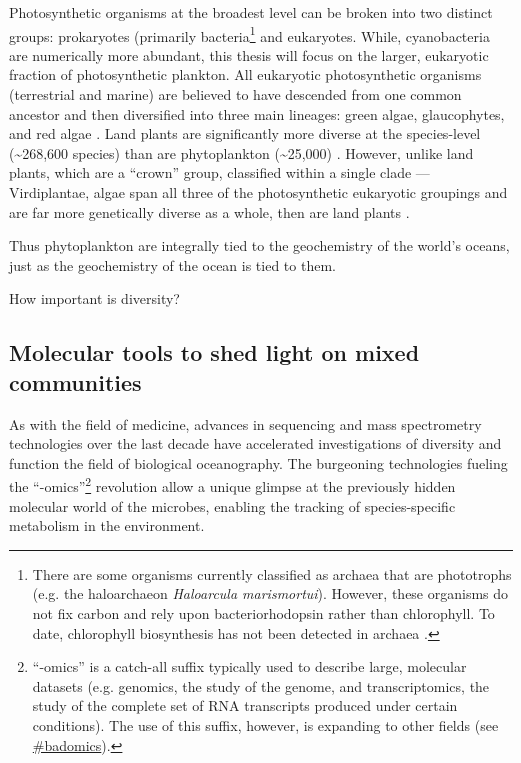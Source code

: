 Photosynthetic organisms at the broadest level can be broken into two distinct groups: prokaryotes (primarily bacteria\footnote{There are some organisms currently classified as archaea that are phototrophs (e.g. the haloarchaeon \textit{Haloarcula marismortui}). However, these organisms do not fix carbon and rely upon bacteriorhodopsin rather than chlorophyll. To date, chlorophyll biosynthesis has not been detected in archaea \citep{Bryant2006}.} and eukaryotes. While, cyanobacteria are numerically more abundant, this thesis will focus on the larger, eukaryotic fraction of photosynthetic plankton. All eukaryotic photosynthetic organisms (terrestrial and marine) are believed to have descended from one common ancestor and then diversified into three main lineages: green algae, glaucophytes, and red algae \citep{Falkowski2004}. Land plants are significantly more diverse at the species-level (\textasciitilde268,600 species)\citep{Chapman2009} than are phytoplankton (\textasciitilde25,000) \citep{Costello2013}. However, unlike land plants, which are a ``crown'' group, classified within a single clade --- Virdiplantae, algae span all three of the photosynthetic eukaryotic groupings and are far more genetically diverse as a whole, then are land plants \citep{Falkowski2004}.  
\par
Thus phytoplankton are integrally tied to the geochemistry of the world's oceans, just as the geochemistry of the ocean is tied to them. 


{How important is diversity?}

\subsection{Molecular tools to shed light on mixed communities}

As with the field of medicine, advances in sequencing and mass spectrometry technologies over the last decade have accelerated investigations of diversity and function the field of biological oceanography. The burgeoning technologies fueling the ``-omics''\footnote{``-omics'' is a catch-all suffix typically used to describe large, molecular datasets (e.g. genomics, the study of the genome, and transcriptomics, the study of the complete set of RNA transcripts produced under certain conditions). The use of this suffix, however, is expanding to other fields (see \href{https://twitter.com/search?q=\%23badomics&src=typd&lang=en}{\#badomics}). } revolution allow a unique glimpse at the previously hidden molecular world of the microbes, enabling the tracking of species-specific metabolism in the environment. \par

